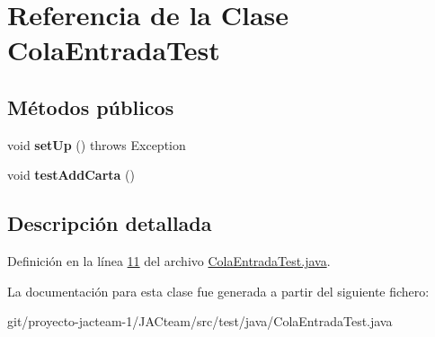 \hypertarget{class_cola_entrada_test}{}\section{Referencia de la Clase Cola\+Entrada\+Test}
\label{class_cola_entrada_test}
\subsection*{Métodos públicos}
\begin{DoxyCompactItemize}
\item 
\mbox{\label{class_cola_entrada_test_a839e08599607310948c7a4affc80d2fc}} 
void {\bfseries set\+Up} ()  throws Exception 
\item 
\mbox{\label{class_cola_entrada_test_a796cc38bc3bd9cf7be5dc6f073593755}} 
void {\bfseries test\+Add\+Carta} ()
\end{DoxyCompactItemize}


\subsection{Descripción detallada}


Definición en la línea \mbox{\hyperlink{_cola_entrada_test_8java_source_l00011}{11}} del archivo \mbox{\hyperlink{_cola_entrada_test_8java_source}{Cola\+Entrada\+Test.\+java}}.



La documentación para esta clase fue generada a partir del siguiente fichero\+:\begin{DoxyCompactItemize}
\item 
git/proyecto-\/jacteam-\/1/\+J\+A\+Cteam/src/test/java/Cola\+Entrada\+Test.\+java\end{DoxyCompactItemize}
